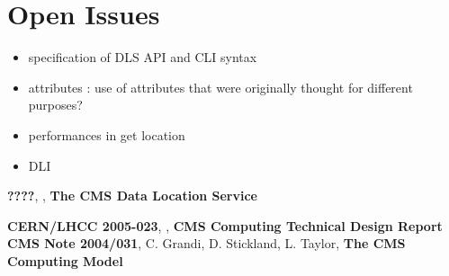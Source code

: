 \documentclass[pdftex]{cmspaper}
\begin{document}
\section{Open Issues}
\begin{itemize}
 \item specification of DLS API and CLI syntax
 \item attributes : use of attributes that were originally thought for different purposes?
 \item performances in get location
 \item DLI 
\end{itemize}  

\begin{thebibliography}{9}
   {\bf ????}, , {\bf The CMS Data Location Service} 
  
   {\bf CERN/LHCC 2005-023}, , {\bf CMS Computing Technical Design Report}
   {\bf CMS Note 2004/031}, C. Grandi, D. Stickland,
               L. Taylor, {\bf The CMS Computing Model}

\end{thebibliography}
 
\pagebreak
\end{document}
